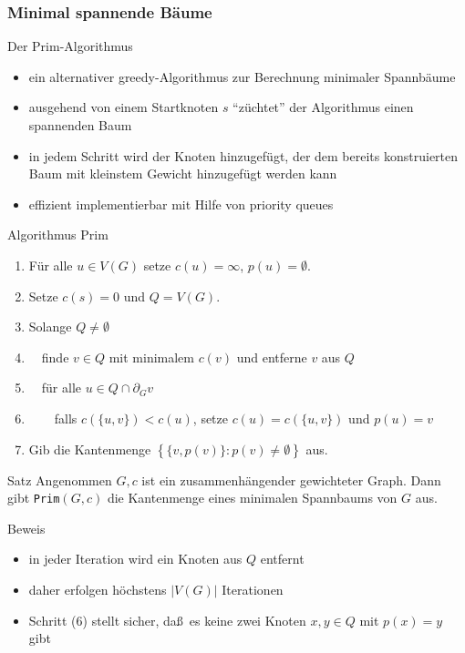 \documentclass[aspectratio=1610, 11pt]{beamer}
\newcommand\cbc[1]{\left\{{#1}\right\}}
\newcommand{\mytitle}{Minimal spannende B\"aume}
\begin{document}
\begin{frame}\frametitle{\mytitle}
	\begin{overprint}
		\begin{exampleblock}{Der Prim-Algorithmus}
			\begin{itemize}
				\item ein alternativer greedy-Algorithmus zur Berechnung minimaler Spannb\"aume
				\item ausgehend von einem Startknoten $s$ ``z\"uchtet'' der Algorithmus einen spannenden Baum
				\item in jedem Schritt wird der Knoten hinzugef\"ugt, der dem bereits konstruierten Baum mit kleinstem Gewicht hinzugef\"ugt werden kann
				\item effizient implementierbar mit Hilfe von priority queues
			\end{itemize}
		\end{exampleblock}
		\begin{exampleblock}{Algorithmus Prim}
	\begin{enumerate}
		\item F\"ur alle $u\in V(G)$ setze $c(u)=\infty$, $p(u)=\emptyset$.
		\item Setze $c(s)=0$ und $Q=V(G)$.
		\item Solange $Q\neq\emptyset$
		\item $\quad$finde $v\in Q$ mit minimalem $c(v)$ und entferne $v$ aus $Q$
		\item $\quad$f\"ur alle $u\in Q\cap\partial_Gv$
		\item $\quad\quad$falls $c(\{u,v\})<c(u)$, setze $c(u)=c(\{u,v\})$ und $p(u)=v$
		\item Gib die Kantenmenge $\cbc{\{v,p(v)\}:p(v)\neq\emptyset}$ aus.
	\end{enumerate}
		\end{exampleblock}
\begin{block}{Satz}
	Angenommen $G,c$ ist ein zusammenh\"angender gewichteter Graph.
	Dann gibt {\tt Prim}$(G,c)$ die Kantenmenge eines minimalen Spannbaums von $G$ aus.
\end{block}
\begin{exampleblock}{Beweis}
	\begin{itemize}
		\item in jeder Iteration wird ein Knoten aus $Q$ entfernt
		\item daher erfolgen h\"ochstens $|V(G)|$ Iterationen
		\item Schritt (6) stellt sicher, da\ss\ es keine zwei Knoten $x,y\in Q$ mit $p(x)=y$ gibt

\end{itemize}
\end{exampleblock}
\end{overprint}
\end{frame}
\end{document}
